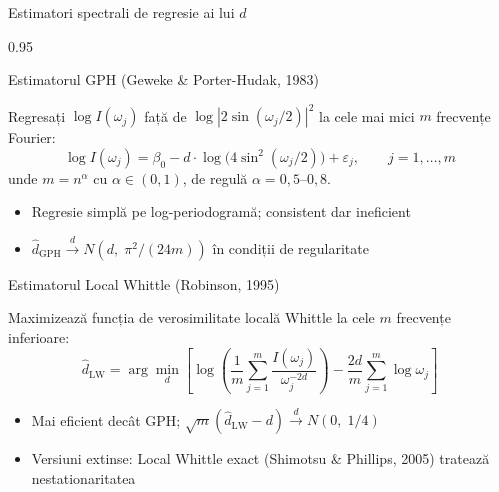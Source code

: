 \documentclass[9pt, aspectratio=169, t]{beamer}
\begin{document}
\begin{frame}{Estimatori spectrali de regresie ai lui $d$}
    \begin{cminipage}{0.95\textwidth}
    \vspace{-3mm}
    \begin{block}{Estimatorul GPH (Geweke \& Porter-Hudak, 1983)}
        {\small Regresați $\log I(\omega_j)$ față de $\log|2\sin(\omega_j/2)|^2$ la cele mai mici $m$ frecvențe Fourier:
        \[
            \log I(\omega_j) = \beta_0 - d \cdot \log\!\big(4\sin^2(\omega_j/2)\big) + \varepsilon_j, \qquad j = 1, \ldots, m
        \]
        unde $m = n^\alpha$ cu $\alpha \in (0,1)$, de regulă $\alpha = 0{,}5$--$0{,}8$.
        \begin{itemize}\setlength{\itemsep}{0pt}
            \item Regresie simplă pe log-periodogramă; consistent dar ineficient
            \item $\hat{d}_{\text{GPH}} \xrightarrow{d} N(d,\; \pi^2/(24m))$ în condiții de regularitate
        \end{itemize}}
    \end{block}
    \vspace{-3mm}
    \begin{exampleblock}{Estimatorul Local Whittle (Robinson, 1995)}
        {\small Maximizează funcția de verosimilitate locală Whittle la cele $m$ frecvențe inferioare:
        \[
            \hat{d}_{\text{LW}} = \arg\min_d \left[\log\!\left(\frac{1}{m}\sum_{j=1}^{m} \frac{I(\omega_j)}{\omega_j^{-2d}}\right) - \frac{2d}{m}\sum_{j=1}^{m}\log\omega_j\right]
        \]
        \begin{itemize}\setlength{\itemsep}{-2pt}
            \item Mai eficient decât GPH; $\sqrt{m}(\hat{d}_{\text{LW}} - d) \xrightarrow{d} N(0,\; 1/4)$
            \item Versiuni extinse: Local Whittle exact (Shimotsu \& Phillips, 2005) tratează nestationaritatea
        \end{itemize}}
    \end{exampleblock}
    \end{cminipage}
\end{frame}
\end{document}
